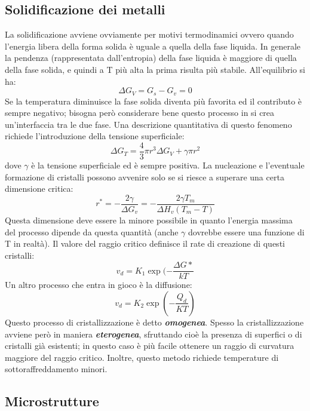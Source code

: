 \subsection{Solidificazione dei metalli}
La solidificazione avviene ovviamente per motivi termodinamici ovvero quando l'energia libera della forma solida è uguale a quella della fase liquida. In generale la pendenza (rappresentata dall'entropia) della fase liquida è maggiore di quella della fase solida, e quindi a T più alta la prima risulta più stabile.
All'equilibrio si ha:
\begin{equation}
    \Delta G_V=G_s-G_v=0
\end{equation}
Se la temperatura diminuisce la fase solida diventa più favorita ed il contributo è sempre negativo; bisogna però considerare bene questo processo in si crea un'interfaccia tra le due fase. Una descrizione quantitativa di questo fenomeno richiede l'introduzione della tensione superficiale:
\begin{equation}
    \Delta G_T=\frac{4}{3}\pi r^3\Delta G_V+\gamma\pi r^2
\end{equation}
dove $\gamma$ è la tensione superficiale ed è sempre positiva. La nucleazione e l'eventuale formazione di cristalli possono avvenire solo se si riesce a superare una certa dimensione critica:
\begin{equation}
    r^*=-\frac{2\gamma}{\Delta G_v}=-\frac{2\gamma T_m}{\Delta H_v(T_m-T)}
\end{equation} 
Questa dimensione deve essere la minore possibile in quanto l'energia massima del processo dipende da questa quantità (anche $\gamma$ dovrebbe essere una funzione di T in realtà).
Il valore del raggio critico definisce il rate di creazione di questi cristalli:
\begin{equation}
    v_d=K_1\exp(-\frac{\Delta G*}{kT}
\end{equation}
Un altro processo che entra in gioco è la diffusione:
\begin{equation}
    v_d=K_2\exp\left(-\frac{Q_d}{KT}\right)
\end{equation}
Questo processo di cristallizzazione è detto \textbf{\textit{omogenea}}.
Spesso la cristallizzazione avviene però in maniera \textbf{\textit{eterogenea}}, sfruttando cioè la presenza di superfici o di cristalli già esistenti; in questo caso è più facile ottenere un raggio di curvatura maggiore del raggio critico. Inoltre, questo metodo richiede temperature di sottoraffreddamento minori.

\subsection{Microstrutture}

